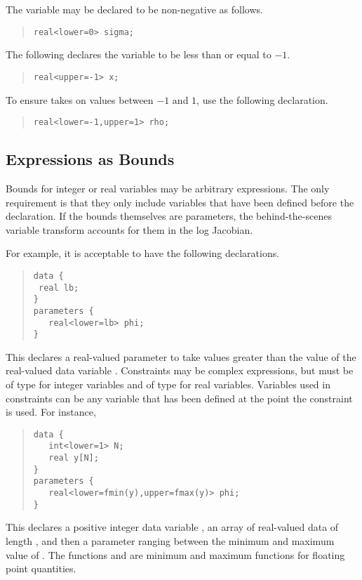 The variable  may be declared to be non-negative as follows.
%
\begin{quote}
\begin{Verbatim}
real<lower=0> sigma;
\end{Verbatim}
\end{quote}
%
The following declares the variable  to be less than or equal
to $-1$.
%
\begin{quote}
\begin{Verbatim} 
real<upper=-1> x;
\end{Verbatim}
\end{quote}
% 
To ensure  takes on values between $-1$ and $1$, use the
following declaration.
%
\begin{quote}
\begin{Verbatim}
real<lower=-1,upper=1> rho;
\end{Verbatim}
\end{quote}
%


\subsection{Expressions as Bounds}

Bounds for integer or real variables may be arbitrary expressions.
The only requirement is that they only include variables that have
been defined before the declaration.  If the bounds themselves are
parameters, the behind-the-scenes variable transform accounts for them
in the log Jacobian.  

For example, it is acceptable to have the
following declarations.
%
\begin{quote}
\begin{Verbatim}
data { 
 real lb;
}
parameters {
   real<lower=lb> phi;
}
\end{Verbatim}
\end{quote}
%
This declares a real-valued parameter  to take values
greater than the value of the real-valued data variable .
Constraints may be complex expressions, but must be of type 
for integer variables and of type  for real variables.
Variables used in constraints can be any variable that has been
defined at the point the constraint is used.  For instance,
\begin{quote}
\begin{Verbatim}
data { 
   int<lower=1> N;
   real y[N];
}
parameters {
   real<lower=fmin(y),upper=fmax(y)> phi;
}
\end{Verbatim}
\end{quote}
%
This declares a positive integer data variable , an array
 of real-valued data of length , and then a parameter
ranging between the minimum and maximum value of .  The
functions  and  are minimum and maximum
functions for floating point quantities.


